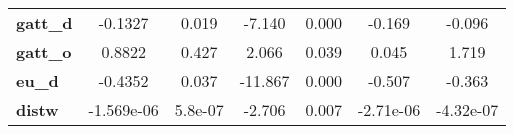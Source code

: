 \begin{center}
\begin{tabular}{lcccccc}
\textbf{gatt\_d}                                                   &      -0.1327  &        0.019     &    -7.140  &         0.000        &       -0.169    &       -0.096     \\
\textbf{gatt\_o}                                                   &       0.8822  &        0.427     &     2.066  &         0.039        &        0.045    &        1.719     \\
\textbf{eu\_d}                                                     &      -0.4352  &        0.037     &   -11.867  &         0.000        &       -0.507    &       -0.363     \\
\textbf{distw}                                                     &   -1.569e-06  &      5.8e-07     &    -2.706  &         0.007        &    -2.71e-06    &    -4.32e-07     \\
\bottomrule
\end{tabular}
\end{center}